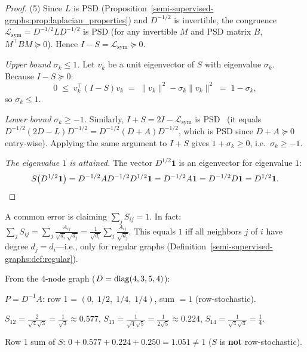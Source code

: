 \begin{notechapter}
\begin{proof}
(5) Since $L$ is PSD (Proposition~\ref{semi-supervised-graphs:prop:laplacian_properties}) and
$D^{-1/2}$ is invertible, the congruence $\mathcal{L}_{\mathrm{sym}}
= D^{-1/2}LD^{-1/2}$ is PSD (for any invertible $M$ and PSD matrix $B$,
$M^\top BM \succeq 0$). Hence $I - S = \mathcal{L}_{\mathrm{sym}} \succeq 0$.

\emph{Upper bound $\sigma_k \leq 1$.} Let $v_k$ be a unit eigenvector of $S$
with eigenvalue $\sigma_k$. Because $I - S \succeq 0$:
\[
  0 \;\leq\; v_k^\top(I - S)v_k \;=\; \|v_k\|^2 - \sigma_k\|v_k\|^2
  \;=\; 1 - \sigma_k,
\]
so $\sigma_k \leq 1$.

\emph{Lower bound $\sigma_k \geq -1$.} Similarly, $I + S
= 2I - \mathcal{L}_{\mathrm{sym}}$ is PSD~\cite{semi-supervised-graphs:chung1997}
(it equals $D^{-1/2}(2D - L)D^{-1/2} = D^{-1/2}(D+A)D^{-1/2}$, which is PSD
since $D + A \succeq 0$ entry-wise). Applying the same argument to $I + S$
gives $1 + \sigma_k \geq 0$, i.e.\ $\sigma_k \geq -1$.

\emph{The eigenvalue $1$ is attained.} The vector $D^{1/2}\mathbf{1}$ is an
eigenvector for eigenvalue $1$:
\[
  S\bigl(D^{1/2}\mathbf{1}\bigr)
  = D^{-1/2}AD^{-1/2}D^{1/2}\mathbf{1}
  = D^{-1/2}A\mathbf{1}
  = D^{-1/2}D\mathbf{1}
  = D^{1/2}\mathbf{1}. \qedhere
\]
\end{proof}

\begin{remark}
\label{semi-supervised-graphs:rem:row_sums}
A common error is claiming $\sum_j S_{ij} = 1$. In fact:
$\sum_j S_{ij} = \sum_j \frac{A_{ij}}{\sqrt{d_i}\sqrt{d_j}}
= \frac{1}{\sqrt{d_i}}\sum_j \frac{A_{ij}}{\sqrt{d_j}}$.
This equals $1$ iff all neighbors $j$ of $i$ have degree $d_j = d_i$---i.e.,
only for regular graphs (Definition~\ref{semi-supervised-graphs:def:regular}).
\end{remark}

\begin{numericalexample}[title=Comparing $P$ and $S$]
From the 4-node graph ($D = \operatorname{diag}(4,3,5,4)$):

$P = D^{-1}A$: row 1 = $(0,\; 1/2,\; 1/4,\; 1/4)$, sum $= 1$ \checkmark\;
(row-stochastic).

$S_{12} = \frac{2}{\sqrt{4}\sqrt{3}} = \frac{1}{\sqrt{3}} \approx 0.577$, \;
$S_{13} = \frac{1}{\sqrt{4}\sqrt{5}} = \frac{1}{2\sqrt{5}} \approx 0.224$, \;
$S_{14} = \frac{1}{\sqrt{4}\sqrt{4}} = \frac{1}{4}$.

Row 1 sum of $S$: $0 + 0.577 + 0.224 + 0.250 = 1.051 \neq 1$ \;
($S$ is \textbf{not} row-stochastic).
\end{numericalexample}


\end{notechapter}

